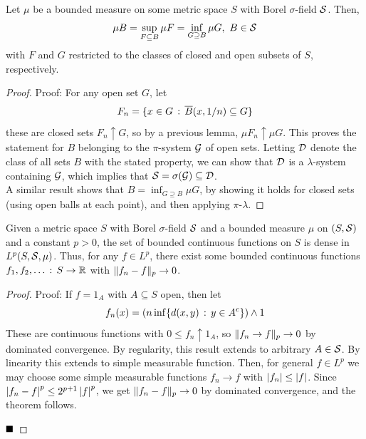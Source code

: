 \begin{lemma}
    Let $\mu$ be a bounded measure on some metric space $S$ with Borel $\sigma$-field $\cal{S}$. Then, 
    \[ \mu B = \sup_{F \subseteq B} \mu F = \inf_{G \supseteq B} \mu G,\ B \in \cal{S} \]
    with $F$ and $G$ restricted to the classes of closed and open subsets of $S$, respectively. 
\end{lemma}
\begin{proof}{Proof:}
    For any open set $G$, let 
    \[ F_n = \{x \in G \col \overline{B}(x, 1/n) \subseteq G\} \]
    these are closed sets $F_n \uparrow G$, so by a previous lemma, $\mu F_n \uparrow \mu G$. This proves the statement for $B$ belonging to the $\pi$-system $\cal{G}$ of open sets. Letting $\cal{D}$ denote the class of all sets $B$ with the stated property, we can show that $\cal{D}$ is a $\lambda$-system containing $\cal{G}$, which implies that $\cal{S} = \sigma(\cal{G}) \subseteq \cal{D}$.\\

    A similar result shows that $B = \inf_{G \supseteq B} \mu G$, by showing it holds for closed sets (using open balls at each point), and then applying $\pi$-$\lambda$. 
\end{proof}

\begin{lemma}
    Given a metric space $S$ with Borel $\sigma$-field $\cal{S}$ and a bounded measure $\mu$ on $(S, \cal{S})$ and a constant $p > 0$, the set of bounded continuous functions on $S$ is dense in $L^{p}(S, \cal{S}, \mu)$. Thus, for any $f \in L^{p}$, there exist some bounded continuous functions $f_1, f_2, \ldots \col S \to \R$ with $\norm{f_n - f}_{p} \to 0$. 
\end{lemma}
\begin{proof}{Proof:}
    If $f = 1_{A}$ with $A \subseteq S$ open, then let
    \[ f_{n}(x) = (n\inf\{d(x, y) \col y \in A^{c}\}) \wedge 1 \]
    These are continuous functions with $0 \leq f_n \uparrow 1_{A}$, so $\norm{f_{n} \to f}_{p} \to 0$ by dominated convergence. By regularity, this result extends to arbitrary $A \in \cal{S}$. By linearity this extends to simple measurable function. Then, for general $f \in L^{p}$ we may choose some simple measurable functions $f_n \to f$ with $\abs{f_n} \leq \abs{f}$. Since $\abs{f_n - f}^{p} \leq 2^{p + 1}\abs{f}^{p}$, we get $\norm{f_n - f}_{p} \to 0$ by dominated convergence, and the theorem follows.

    $\qed$
\end{proof}

